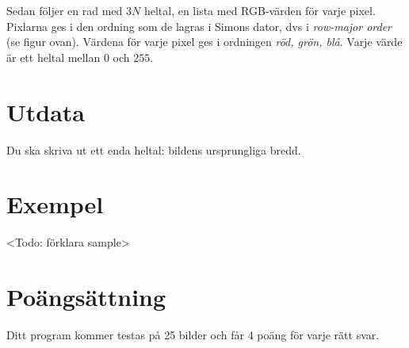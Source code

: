 Sedan följer en rad med $3N$ heltal, en lista med RGB-värden för varje pixel.
Pixlarna ges i den ordning som de lagras i Simons dator, dvs i \emph{row-major
order} (se figur ovan). Värdena för varje pixel ges i ordningen \emph{röd,
grön, blå}. Varje värde är ett heltal mellan $0$ och $255$.

\section*{Utdata}
Du ska skriva ut ett enda heltal: bildens ursprungliga bredd.

\section*{Exempel}
<Todo: förklara sample>

\section*{Poängsättning}
Ditt program kommer testas på 25 bilder och får 4 poäng för varje rätt svar.
